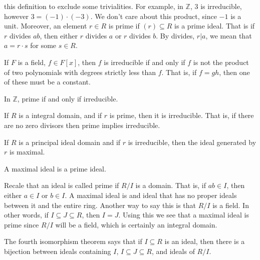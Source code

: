 \documentclass{article}                                                        %
\begin{document}
            this definition to exclude some trivialities. For example, in
            $\mathbb{Z}$, 3 is irreducible, however
            $3=(\minus{1})\cdot(\minus{3})$. We don't care about this product,
            since $\minus{1}$ is a unit. Moreover, an element $r\in{R}$ is
            prime if $(r)\subseteq{R}$ is a prime ideal. That is if
            $r$ divides $ab$, then either $r$ divides $a$ or $r$ divides $b$.
            By divides, $r|a$, we mean that $a=r\cdot{s}$ for some $s\in{R}$.
            \begin{example}
                If $F$ is a field, $f\in{F}[x]$, then $f$ is irreducible if and
                only if $f$ is not the product of two polynomials with degrees
                strictly less than $f$. That is, if $f=gh$, then one of these
                must be a constant.
            \end{example}
            \begin{example}
                In $\mathbb{Z}$, prime if and only if irreducible.
            \end{example}
            \begin{theorem}
                If $R$ is a integral domain, and if $r$ is prime, then it is
                irreducible. That is, if there are no zero divisors then prime
                implies irreducible.
            \end{theorem}
            \begin{theorem}
                If $R$ is a principal ideal domain and if $r$ is irreducible,
                then the ideal generated by $r$ is maximal.
            \end{theorem}
            \begin{theorem}
                A maximal ideal is a prime ideal.
            \end{theorem}
            Recale that an ideal is called prime if $R/I$ is a domain. That is,
            if $ab\in{I}$, then either $a\in{I}$ or $b\in{I}$. A maximal ideal
            is and ideal that has no proper ideals between it and the entire
            ring. Another way to say this is that $R/I$ is a field. In other
            words, if $I\subseteq{J}\subseteq{R}$, then $I=J$. Using this we see
            that a maximal ideal is prime since $R/I$ will be a field, which is
            certainly an integral domain.
            \begin{theorem}
                The fourth isomorphism theorem says that if $I\subseteq{R}$ is
                an ideal, then there is a bijection between ideals containing
                $I$, $I\subseteq{J}\subseteq{R}$, and ideals of $R/I$.
            \end{theorem}
\end{document}
